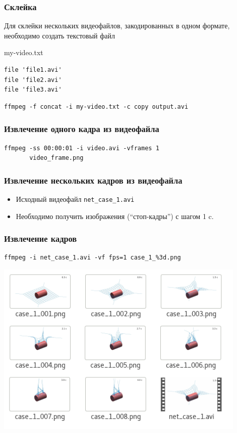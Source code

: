 \documentclass[11pt, compress]{beamer}
\newcommand{\code}[1]{\textcolor{dark-green}{\texttt{#1}}}
\begin{document}
\begin{frame}[c, fragile]
\frametitle{Склейка}
Для склейки нескольких видеофайлов, закодированных в одном формате, необходимо создать текстовый файл
\begin{block}{my-video.txt}
\begin{lstlisting}
file 'file1.avi'
file 'file2.avi'
file 'file3.avi'
\end{lstlisting}
\end{block}
\begin{lstlisting}
ffmpeg -f concat -i my-video.txt -c copy output.avi
\end{lstlisting}
\end{frame}

\begin{frame}[c, fragile]
\frametitle{Извлечение одного кадра из видеофайла}
\begin{lstlisting}
ffmpeg -ss 00:00:01 -i video.avi -vframes 1 
       video_frame.png
\end{lstlisting}
\end{frame}


\begin{frame}[c, fragile]
\frametitle{Извлечение нескольких кадров из видеофайла}
\begin{itemize}
  \item Исходный видеофайл \code{net\_case\_1.avi}
  \item Необходимо получить изображения (``стоп-кадры'') с шагом 1 c.
\end{itemize}
\end{frame}

\begin{frame}[c, fragile]
\frametitle{Извлечение кадров}
\begin{lstlisting}
ffmpeg -i net_case_1.avi -vf fps=1 case_1_%3d.png
\end{lstlisting}
\begin{center}
\includegraphics[width=0.9\textwidth]{montage_gallery.png}
\end{center}
\end{frame}
\end{document}
